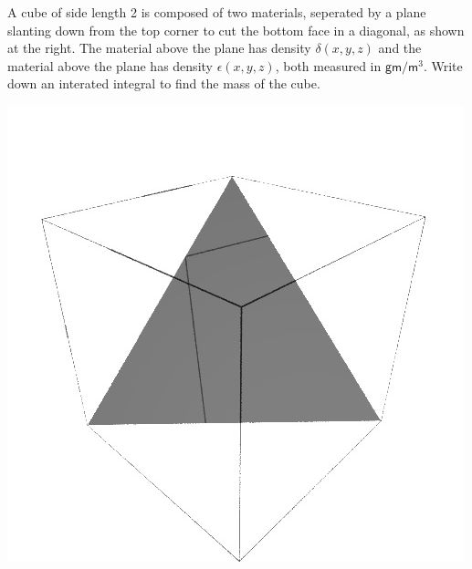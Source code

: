 \documentclass[answers,12pt,addpoints]{exam}
\begin{document}
\begin{questions}
\begin{multicols}{2}
\question[25] A cube of side length 2 is composed
of two materials, seperated by a plane slanting down
from the top corner to cut the bottom face in a diagonal,
as shown at the right. The material above the plane
has density $\delta\left(x,y,z\right)$ and the material
above the plane has density $\epsilon\left(x,y,z\right)$,
both measured in $\mathsf{gm}/\mathsf{m}^3$.
Write down an interated integral to find the mass of the cube.
\begin{center}\includegraphics[scale=.4]{BoxPlane}\end{center}
\end{multicols}

\question[25] 
\begin{parts}
\begin{multicols}{2}

\end{multicols}
\end{parts}
\end{questions}
\end{document}
